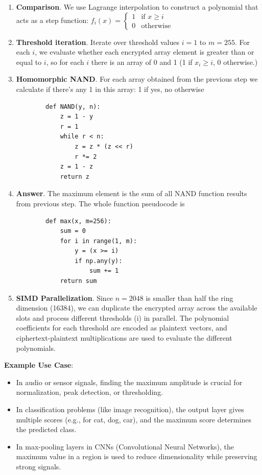 \documentclass[article]{iacrtrans}
\begin{document}
\begin{enumerate}
    \item \textbf{Comparison}. We use Lagrange interpolation to construct a polynomial that acts as a step function: $ f_i(x) = 
    \begin{cases} 1 & \text{if } x \geq i \\ 0 & \text{otherwise} 
    \end{cases} $
    
    \item \textbf{Threshold iteration}. Iterate over threshold values \( i = 1 \) to \( m = 255 \). For each \( i \), we evaluate whether each encrypted array element is greater than or equal to \( i \), so for each \( i \) there is an array of 0 and 1 (1 if $x_i \geq i$, 0 otherwise.)
    
    \item \textbf{Homomorphic NAND}. For each array obtained from the previous step we calculate if there's  any 1 in this array: 1 if yes, no otherwise
        \begin{lstlisting}
        def NAND(y, n):
            z = 1 - y
            r = 1
            while r < n:
                z = z * (z << r)
                r *= 2
            z = 1 - z
            return z
        \end{lstlisting}
        
    \item \textbf{Answer}. The maximum element is the sum of all NAND function results from previous step. The whole function pseudocode is
        \begin{lstlisting}
        def max(x, m=256):
            sum = 0
            for i in range(1, m):
                y = (x >= i)
                if np.any(y):
                    sum += 1
            return sum
        \end{lstlisting}

    \item \textbf{SIMD Parallelization}. Since $n = 2048$ is smaller than half the ring dimension (16384), we can duplicate the encrypted array across the available slots and process different thresholds (i) in parallel. The polynomial coefficients for each threshold are encoded as plaintext vectors, and ciphertext-plaintext multiplications are used to evaluate the different polynomials.
\end{enumerate}

\textbf{Example Use Case}:
\begin{itemize}
    \item In audio or sensor signals, finding the maximum amplitude is crucial for normalization, peak detection, or thresholding.
    \item In classification problems (like image recognition), the output layer gives multiple scores (e.g., for cat, dog, car), and the maximum score determines the predicted class.
    \item In max-pooling layers in CNNs (Convolutional Neural Networks), the maximum value in a region is used to reduce dimensionality while preserving strong signals.
\end{itemize}
\end{document}
